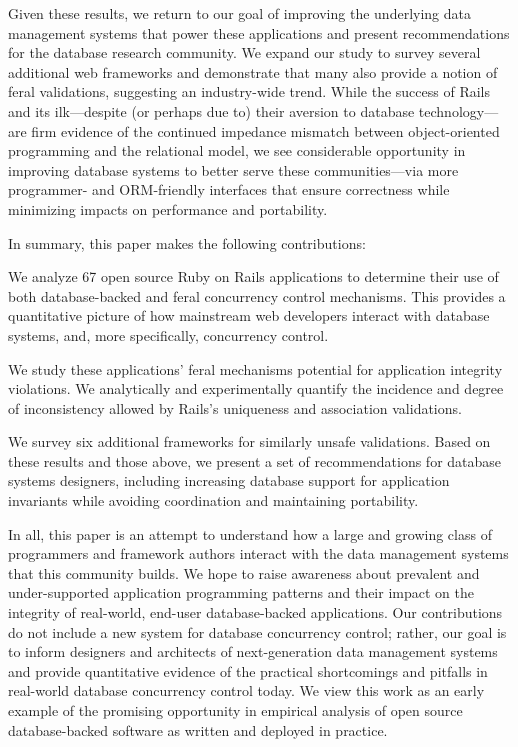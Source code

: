 Given these results, we return to our goal of improving the underlying
data management systems that power these applications and present
recommendations for the database research community. We expand our
study to survey several additional web frameworks and demonstrate that
many also provide a notion of feral validations, suggesting an
industry-wide trend. While the success of Rails and its ilk---despite
(or perhaps due to) their aversion to database technology---are firm
evidence of the continued impedance mismatch between object-oriented
programming and the relational model, we see considerable opportunity
in improving database systems to better serve these communities---via
more programmer- and ORM-friendly interfaces that ensure correctness
while minimizing impacts on performance and portability.

In summary, this paper makes the following contributions:
\begin{myitemize}
\item We analyze 67 open source Ruby on Rails applications to
  determine their use of both database-backed and feral concurrency
  control mechanisms. This provides a quantitative picture of how
  mainstream web developers interact with database systems, and, more
  specifically, concurrency control.

\item We study these applications' feral mechanisms potential for
  application integrity violations. We analytically and experimentally
  quantify the incidence and degree of inconsistency allowed by
  Rails's uniqueness and association validations.

\item We survey six additional frameworks for similarly unsafe
  validations. Based on these results and those above, we present a
  set of recommendations for database systems designers, including
  increasing database support for application invariants while avoiding
  coordination and maintaining portability.
\end{myitemize}

In all, this paper is an attempt to understand how a large and growing
class of programmers and framework authors interact with the data
management systems that this community builds. We hope to raise
awareness about prevalent and under-supported application programming
patterns and their impact on the integrity of real-world, end-user
database-backed applications. Our contributions do not include a new
system for database concurrency control; rather, our goal is to inform
designers and architects of next-generation data management systems
and provide quantitative evidence of the practical shortcomings and
pitfalls in real-world database concurrency control today. We view
this work as an early example of the promising opportunity in
empirical analysis of open source database-backed software as written and deployed in practice.

